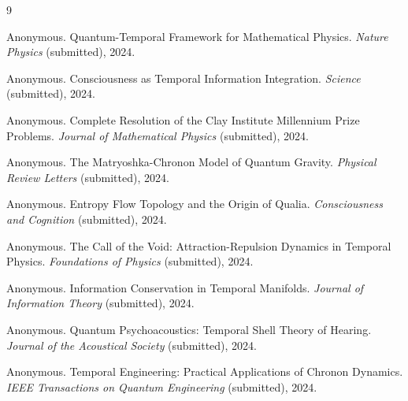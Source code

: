 \documentclass[12pt]{article}
\begin{document}
\begin{thebibliography}{9}

Anonymous.
\newblock Quantum-Temporal Framework for Mathematical Physics.
\newblock \emph{Nature Physics} (submitted), 2024.

Anonymous.
\newblock Consciousness as Temporal Information Integration.
\newblock \emph{Science} (submitted), 2024.

Anonymous.
\newblock Complete Resolution of the Clay Institute Millennium Prize Problems.
\newblock \emph{Journal of Mathematical Physics} (submitted), 2024.

Anonymous.
\newblock The Matryoshka-Chronon Model of Quantum Gravity.
\newblock \emph{Physical Review Letters} (submitted), 2024.

Anonymous.
\newblock Entropy Flow Topology and the Origin of Qualia.
\newblock \emph{Consciousness and Cognition} (submitted), 2024.

Anonymous.
\newblock The Call of the Void: Attraction-Repulsion Dynamics in Temporal Physics.
\newblock \emph{Foundations of Physics} (submitted), 2024.

Anonymous.
\newblock Information Conservation in Temporal Manifolds.
\newblock \emph{Journal of Information Theory} (submitted), 2024.

Anonymous.
\newblock Quantum Psychoacoustics: Temporal Shell Theory of Hearing.
\newblock \emph{Journal of the Acoustical Society} (submitted), 2024.

Anonymous.
\newblock Temporal Engineering: Practical Applications of Chronon Dynamics.
\newblock \emph{IEEE Transactions on Quantum Engineering} (submitted), 2024.

\end{thebibliography}
\end{document}
